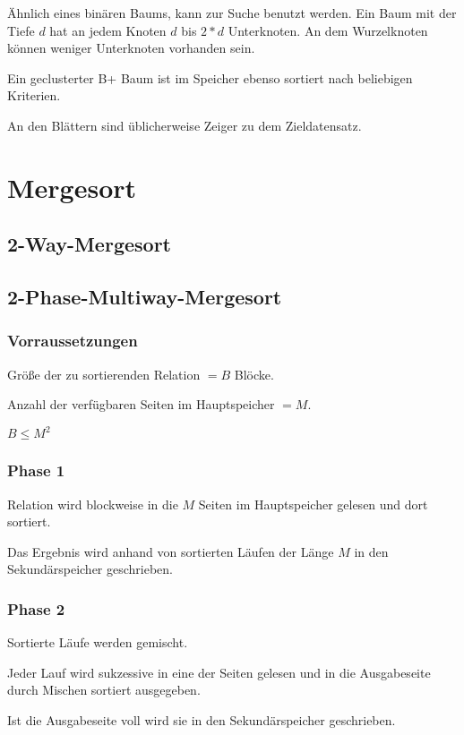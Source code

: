 \documentclass[10pt,a4paper,oneside]{report}
\begin{document}
Ähnlich eines binären Baums, kann zur Suche benutzt werden. Ein Baum mit der Tiefe $d$ hat an jedem Knoten $d$ bis $2*d$ Unterknoten. An dem Wurzelknoten können weniger Unterknoten vorhanden sein.

Ein geclusterter B+ Baum ist im Speicher ebenso sortiert nach beliebigen Kriterien.

An den Blättern sind üblicherweise Zeiger zu dem Zieldatensatz.

\section*{Mergesort}

\subsection*{2-Way-Mergesort}

\subsection*{2-Phase-Multiway-Mergesort}

\subsubsection*{Vorraussetzungen}

Größe der zu sortierenden Relation $= B$ Blöcke.

Anzahl der verfügbaren Seiten im Hauptspeicher $= M$.

$B \leq M^2$

\subsubsection*{Phase 1}

Relation wird blockweise in die $M$ Seiten im Hauptspeicher gelesen und dort sortiert.

Das Ergebnis wird anhand von sortierten Läufen der Länge $M$ in den Sekundärspeicher geschrieben.

\subsubsection*{Phase 2}

Sortierte Läufe werden gemischt.

Jeder Lauf wird sukzessive in eine der Seiten gelesen und in die Ausgabeseite durch Mischen sortiert ausgegeben.

Ist die Ausgabeseite voll wird sie in den Sekundärspeicher geschrieben.
\end{document}
